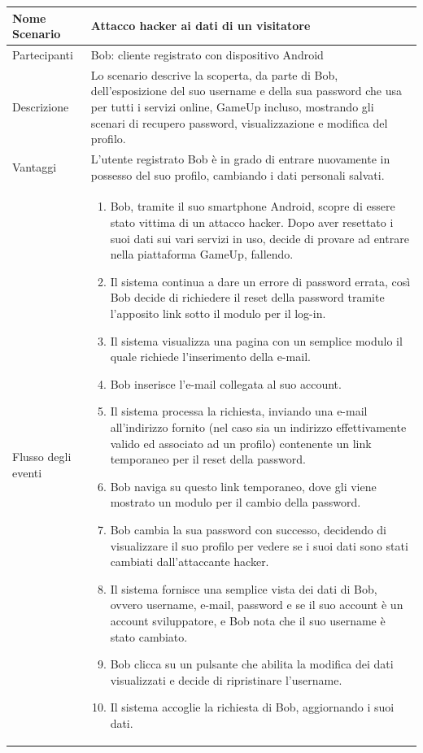 	\small\begin{tabular}{|| l | p{30em} ||} 
	\hline
	Nome Scenario & Attacco hacker ai dati di un visitatore\\
	\hline
	Partecipanti & Bob: cliente registrato con dispositivo Android\\
	\hline
	Descrizione & Lo scenario descrive la scoperta, da parte di Bob, dell’esposizione del suo username e della sua password che usa per tutti i servizi online, GameUp incluso, mostrando gli scenari di recupero password, visualizzazione e modifica del profilo.\\
	\hline
	Vantaggi & L’utente registrato Bob è in grado di entrare nuovamente in possesso del suo profilo, cambiando i dati personali salvati.\\
	\hline
	Flusso degli eventi &
	\begin{enumerate}
		\item Bob, tramite il suo smartphone Android, scopre di essere stato vittima di un attacco hacker. Dopo aver resettato i suoi dati sui vari servizi in uso, decide di provare ad entrare nella piattaforma GameUp, fallendo.
		\item Il sistema continua a dare un errore di password errata, così Bob decide di richiedere il reset della password tramite l’apposito link sotto il modulo per il log-in.
		\item Il sistema visualizza una pagina con un semplice modulo il quale richiede l’inserimento della e-mail.
		\item Bob inserisce l’e-mail collegata al suo account.
		\item Il sistema processa la richiesta, inviando una e-mail all’indirizzo fornito (nel caso sia un indirizzo effettivamente valido ed associato ad un profilo) contenente un link temporaneo per il reset della password.
		\item Bob naviga su questo link temporaneo, dove gli viene mostrato un modulo per il cambio della password.
		\item Bob cambia la sua password con successo, decidendo di visualizzare il suo profilo per vedere se i suoi dati sono stati cambiati dall’attaccante hacker.
		\item Il sistema fornisce una semplice vista dei dati di Bob, ovvero username, e-mail, password e se il suo account è un account sviluppatore, e Bob nota che il suo username è stato cambiato.
		\item Bob clicca su un pulsante che abilita la modifica dei dati visualizzati e decide di ripristinare l’username.
		\item Il sistema accoglie la richiesta di Bob, aggiornando i suoi dati.
	\end{enumerate} \\
	\hline
	\end{tabular}

